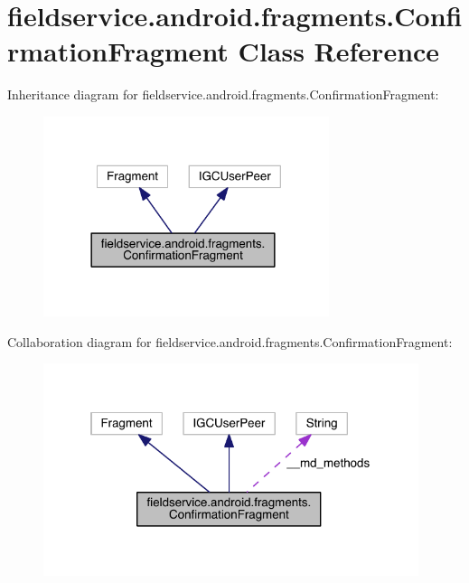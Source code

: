 \hypertarget{classfieldservice_1_1android_1_1fragments_1_1_confirmation_fragment}{\section{fieldservice.\+android.\+fragments.\+Confirmation\+Fragment Class Reference}
\label{classfieldservice_1_1android_1_1fragments_1_1_confirmation_fragment}
}


Inheritance diagram for fieldservice.\+android.\+fragments.\+Confirmation\+Fragment\+:
\nopagebreak
\begin{figure}[H]
\begin{center}
\leavevmode
\includegraphics[width=237pt]{classfieldservice_1_1android_1_1fragments_1_1_confirmation_fragment__inherit__graph}
\end{center}
\end{figure}


Collaboration diagram for fieldservice.\+android.\+fragments.\+Confirmation\+Fragment\+:
\nopagebreak
\begin{figure}[H]
\begin{center}
\leavevmode
\includegraphics[width=311pt]{classfieldservice_1_1android_1_1fragments_1_1_confirmation_fragment__coll__graph}
\end{center}
\end{figure}
